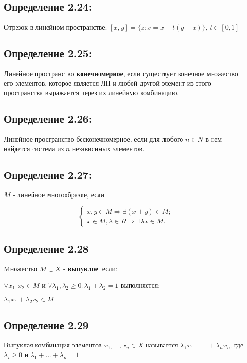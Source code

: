 \documentclass[12pt]{article}
\begin{document}
\subsection*{Определение 2.24:}
	Отрезок в линейном пространстве: $[x,y] = \{ z : x = x + t(y-x) \}$, $t \in [0,1]$
\subsection*{Определение 2.25:}
	Линейное пространство \textbf{конечномерное}, если существует конечное множество его элементов, которое является ЛН и любой другой
	элемент из этого пространства выражается через их линейную комбинацию.
	

	
\subsection*{Определение 2.26:}
	Линейное пространство бесконечномерное, если для любого $n \in N$  в нем найдется система из $n$ независимых элементов.
	
\subsection*{Определение 2.27:}
 	$M$ - линейное многообразие, если 	
	
$$
\begin{cases}
   x,y \in M \Rightarrow \exists (x+y) \in M; \\
   x \in M , \lambda \in R \Rightarrow \exists \lambda x \in M.
\end{cases}
$$

\subsection*{Определение 2.28}
	Mножество $M \subset X$ - \textbf{выпуклое}, если:
	
	$\forall x_1, x_2 \in M$ и $\forall \lambda_1 , \lambda_2 \ge 0 : \lambda_1 + \lambda_2 = 1$ выполняется:
	
	$\lambda_1 x_1 + \lambda_2 x_2 \in M$
	
\subsection*{Определение 2.29}
	Выпуклая комбинация элементов $x_1, ..., x_n \in X$ называется $\lambda_1 x_1 + ... + \lambda_n x_n$, где 
	$\lambda_i \ge 0$ и $\lambda_1  + ...+  \lambda_n = 1$
\end{document}
